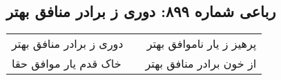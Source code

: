 \begin{center}
\section*{رباعی شماره ۸۹۹: دوری ز برادر منافق بهتر}
\label{sec:0899}
\begin{longtable}{l p{0.5cm} r}
دوری ز برادر منافق بهتر
&&
پرهیز ز یار ناموافق بهتر
\\
خاک قدم یار موافق حقا
&&
از خون برادر منافق بهتر
\\
\end{longtable}
\end{center}
